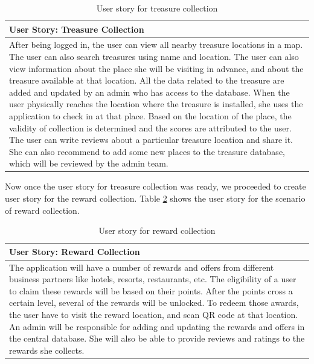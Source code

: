 \documentclass[12pt, a4paper, oneside]{article}
\begin{document}
\begin{table}[H]
\centering
\begin{tabularx}{\linewidth}{|X|} 
\hline
\textbf{User Story:  Treasure Collection}\\ 
\hline
After being logged in, the user can view all nearby treasure locations in a map. The user can also search treasures using name and location.  The user can also view information about the place she will be visiting in advance, and about the treasure available at that location. All the data related to the treasure are added and updated by an admin who has access to the database. When the user physically reaches the location where the treasure is installed, she uses the application to check in at that place. Based on the location of the place, the validity of collection is determined and the scores are attributed to the user. The user can write reviews about a particular treasure location and share it. She can also recommend to add some new places to the treasure database, which will be reviewed by the admin team.\\
\hline
\end{tabularx}
\caption{User story for treasure collection}
\label{table:user-story-treasure-collection}
\end{table}

Now once the user story for treasure collection was ready, we proceeded to create user story for the reward collection. Table \ref{table:user-story-reward-collection} shows the user story for the scenario of reward collection.

\begin{table}[H]
\centering
\begin{tabularx}{\linewidth}{|X|} 
\hline
\textbf{User Story:  Reward Collection}\\ 
\hline
The application will have a number of rewards and offers from different business partners like hotels, resorts, restaurants, etc. The eligibility of a user to claim these rewards will be based on their points. After the points cross a certain level, several of the rewards will be unlocked. To redeem those awards, the user have to visit the reward location, and scan QR code at that location. An admin will be responsible for adding and updating the rewards and offers in the central database. She will also be able to provide reviews and ratings to the rewards she collects.\\
\hline
\end{tabularx}
\caption{User story for reward collection}
\label{table:user-story-reward-collection}
\end{table}
\end{document}
